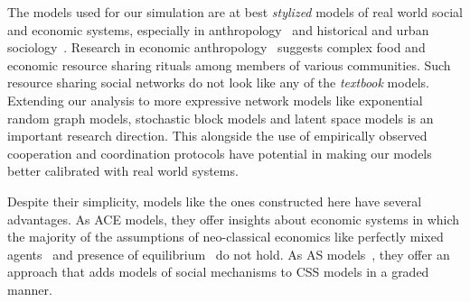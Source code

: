 \documentclass[sigconf]{acmart}
\begin{document}
The models used for our simulation are at best \textit{stylized} models of real world social and economic systems, especially in anthropology~\cite{white2011kinship} and historical and urban sociology~\cite{sampson2012great,katz2013people}. Research in economic anthropology~\cite{koster2019,koster2014,koster2015,bogerhoff2015,smith2019,nolin2012,power2018cooperation,power2018} suggests complex food and economic resource sharing rituals among members of various communities. Such resource sharing social networks do not look like any of the \textit{textbook} models. Extending our analysis to more expressive network models like exponential random graph models, stochastic block models and latent space models is an important research direction. This alongside the use of empirically observed cooperation and coordination protocols have potential in making our models better calibrated with real world systems.   

Despite their simplicity, models like the ones constructed here have several advantages.  As ACE models, they offer insights about economic systems in which the majority of the assumptions of neo-classical economics like perfectly mixed agents~\cite{wilhite} and presence of equilibrium~\cite{arthur} do not hold. As AS models~\cite{hedstrom2011oxford}, they offer an approach that adds models of social mechanisms to CSS models in a graded manner.  





\end{document}
